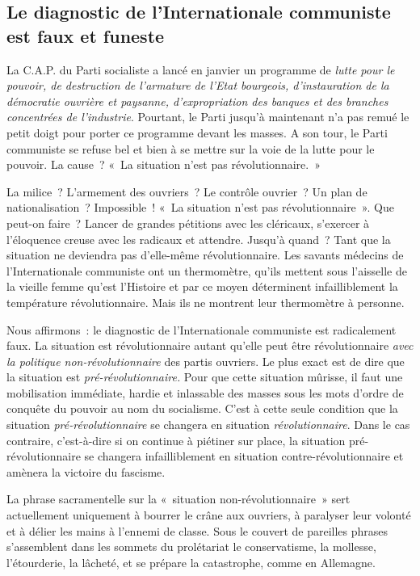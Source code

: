 \documentclass[french,twoside]{book} %
\begin{document}
\subsection[{Le diagnostic de l’Internationale communiste est faux et funeste}]{Le diagnostic de l’Internationale communiste est faux et funeste}
\noindent La C.A.P. du Parti socialiste a lancé en janvier un programme de \emph{lutte pour le pouvoir, de destruction de l’armature de l’Etat bourgeois, d’instauration de la démocratie ouvrière et paysanne, d’expropriation des banques et des branches concentrées de l’industrie}. Pourtant, le Parti jusqu’à maintenant n’a pas remué le petit doigt pour porter ce programme devant les masses. A son tour, le Parti communiste se refuse bel et bien à se mettre sur la voie de la lutte pour le pouvoir. La cause ? « La situation n’est pas révolutionnaire. »\par
 La milice ? L’armement des ouvriers ? Le contrôle ouvrier ? Un plan de nationalisation ? Impossible ! « La situation n’est pas révolutionnaire ». Que peut-on faire ? Lancer de grandes pétitions avec les cléricaux, s’exercer à l’éloquence creuse avec les radicaux et attendre. Jusqu’à quand ? Tant que la situation ne deviendra pas d’elle-même révolutionnaire. Les savants médecins de l’Internationale communiste ont un thermomètre, qu’ils mettent sous l’aisselle de la vieille femme qu’est l’Histoire et par ce moyen déterminent infailliblement la température révolutionnaire. Mais ils ne montrent leur thermomètre à personne.\par
Nous affirmons : le diagnostic de l’Internationale communiste est radicalement faux. La situation est révolutionnaire autant qu’elle peut être révolutionnaire \emph{avec la politique non-révolutionnaire} des partis ouvriers. Le plus exact est de dire que la situation est \emph{pré-révolutionnaire.} Pour que cette situation mûrisse, il faut une mobilisation immédiate, hardie et inlassable des masses sous les mots d’ordre de conquête du pouvoir au nom du socialisme. C’est à cette seule condition que la situation \emph{pré-révolutionnaire} se changera en situation \emph{révolutionnaire}. Dans le cas contraire, c’est-à-dire si on continue à piétiner sur place, la situation pré-révolutionnaire se changera infailliblement en situation contre-révolutionnaire et amènera la victoire du fascisme.\par
La phrase sacramentelle sur la « situation non-révolutionnaire » sert actuellement uniquement à bourrer le crâne aux ouvriers, à paralyser leur volonté et à délier les mains à l’ennemi de classe. Sous le couvert de pareilles phrases s’assemblent dans les sommets du prolétariat le conservatisme, la mollesse, l’étourderie, la lâcheté, et se prépare la catastrophe, comme en Allemagne.
\end{document}
